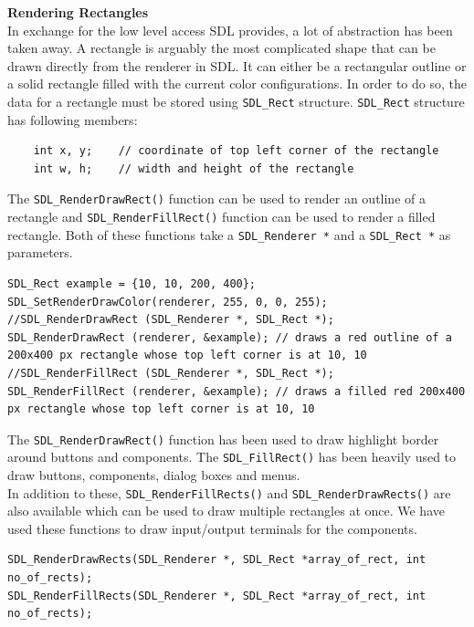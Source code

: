\documentclass[report]{subfiles}
\begin{document}
    \textbf{Rendering Rectangles}\\
    In exchange for the low level access SDL provides, a lot of abstraction has been taken away. A rectangle is arguably the most complicated shape that can be drawn directly from the renderer in SDL. It can either be a rectangular outline or a solid rectangle filled with the current color configurations. In order to do so, the data for a rectangle must be stored using \texttt{SDL\_Rect} structure.
    \texttt{SDL\_Rect} structure has following members:
\begin{lstlisting}
    int x, y;    // coordinate of top left corner of the rectangle
    int w, h;    // width and height of the rectangle
\end{lstlisting}
The \texttt{SDL\_RenderDrawRect()} function can be used to render an outline of a rectangle and \texttt{SDL\_RenderFillRect()} function can be used to render a filled rectangle. Both of these functions take a \texttt{SDL\_Renderer *} and a \texttt{SDL\_Rect *} as parameters.
\begin{lstlisting}
SDL_Rect example = {10, 10, 200, 400};
SDL_SetRenderDrawColor(renderer, 255, 0, 0, 255);
//SDL_RenderDrawRect (SDL_Renderer *, SDL_Rect *);
SDL_RenderDrawRect (renderer, &example); // draws a red outline of a 200x400 px rectangle whose top left corner is at 10, 10
//SDL_RenderFillRect (SDL_Renderer *, SDL_Rect *);
SDL_RenderFillRect (renderer, &example); // draws a filled red 200x400 px rectangle whose top left corner is at 10, 10
\end{lstlisting}
The \texttt{SDL\_RenderDrawRect()} function has been used to draw highlight border around buttons and components. The \texttt{SDL\_FillRect()} has been heavily used to draw buttons, components, dialog boxes and menus.\\
In addition to these, \texttt{SDL\_RenderFillRects()} and \texttt{SDL\_RenderDrawRects()} are also available which can be used to draw multiple rectangles at once. We have used these functions to draw input/output terminals for the components.
\begin{lstlisting}	
SDL_RenderDrawRects(SDL_Renderer *, SDL_Rect *array_of_rect, int no_of_rects);
SDL_RenderFillRects(SDL_Renderer *, SDL_Rect *array_of_rect, int no_of_rects);
\end{lstlisting}
\end{document}
